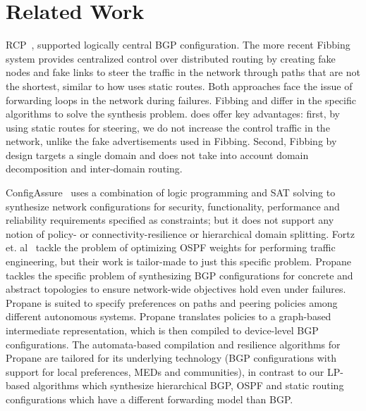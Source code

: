 \section{Related Work}\label{sec:related}
  RCP~\cite{rcp}, supported logically central BGP
configuration. The more recent Fibbing~\cite{fibbing} system provides
centralized control over distributed routing by creating fake nodes
and fake links to steer the traffic in the network through paths that
are not the shortest, similar to how \name uses static routes.  Both
approaches face the issue of forwarding loops in the network during
failures. Fibbing and \name differ in the specific algorithms to solve
the synthesis problem.  \name does offer key advantages: first, by
using static routes for steering, we do not increase the control traffic in
the network, unlike the fake advertisements used in Fibbing. Second,
Fibbing by design targets a single domain and does not take into account
domain decomposition and inter-domain routing. 



ConfigAssure~\cite{configassure}
uses a combination of logic programming and SAT solving to synthesize
network configurations for security, 
functionality, performance and
reliability requirements specified as constraints; 
but it does not
support any notion of policy- or connectivity-resilience 
or hierarchical domain splitting.  Fortz
et. al~\cite{ospf-te} tackle the problem of optimizing OSPF weights
for performing traffic engineering, but their work is tailor-made
to just this specific problem.
Propane~\cite{propane, propaneat} tackles the specific problem of
synthesizing BGP configurations for concrete and abstract topologies
to ensure network-wide objectives hold even under failures. 
Propane is suited to specify preferences on paths and
peering policies among different autonomous systems. Propane
translates policies to a graph-based intermediate representation,
which is then compiled to device-level BGP configurations. 
The automata-based compilation and resilience algorithms for Propane 
are tailored for its underlying technology (BGP configurations with support for 
local preferences, MEDs and communities), in contrast to our LP-based
algorithms which synthesize hierarchical BGP, OSPF and 
static routing configurations which have
a different forwarding model than BGP.


